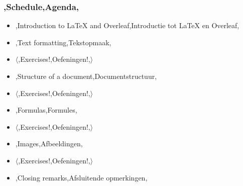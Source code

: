 \begin{frame}
	\frametitle{\lang,Schedule,Agenda,}
	
	\begin{itemize}
		\item \lang,Introduction to LaTeX and Overleaf,Introductie tot LaTeX en Overleaf,
		\item \lang,Text formatting,Tekstopmaak,
		\item  $ \langle $\lang,Exercises!,Oefeningen!,$ \rangle $
		\item \lang,Structure of a document,Documentstructuur,
		\item $ \langle $\lang,Exercises!,Oefeningen!,$ \rangle $
		\item \lang,Formulas,Formules,
		\item $ \mathbf\langle $\lang,Exercises!,Oefeningen!,$ \rangle $
		\item  \lang,Images,Afbeeldingen,
		\item $ \mathbf\langle $\lang,Exercises!,Oefeningen!,$ \rangle $
		\item \lang,Closing remarks,Afsluitende opmerkingen,
	\end{itemize}
\end{frame}
